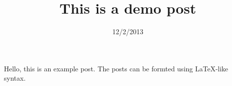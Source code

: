 \begin{post}
\title{This is a demo post}
\date{12/2/2013}
    Hello, this is an example post. The posts can be formted using LaTeX-like
    syntax.
\end{post}
